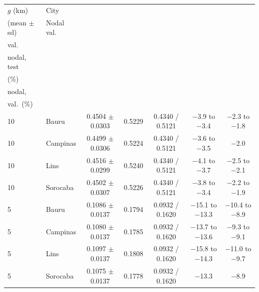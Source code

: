 \begin{tabular}{llccccc}
\toprule
$g$ (km) & City & \celula{Nodal test \\ \relax (mean $\pm$ sd)} & Nodal val. & \celula{Law test / \\ \relax val.} & \celula{Law vs.\ \\ \relax nodal, test \\ \relax (\%)} & \celula{Law vs.\ \\ \relax nodal, \\ \relax val.\ (\%)} \\
\midrule
10 & Bauru & 0.4504 $\pm$ 0.0303 & 0.5229 & 0.4340 / 0.5121 & $-$3.9 to $-$3.4 & $-$2.3 to $-$1.8 \\
10 & Campinas & 0.4499 $\pm$ 0.0306 & 0.5224 & 0.4340 / 0.5121 & $-$3.6 to $-$3.5 & $-$2.0 \\
10 & Lins & 0.4516 $\pm$ 0.0299 & 0.5240 & 0.4340 / 0.5121 & $-$4.1 to $-$3.7 & $-$2.5 to $-$2.1 \\
10 & Sorocaba & 0.4502 $\pm$ 0.0307 & 0.5226 & 0.4340 / 0.5121 & $-$3.8 to $-$3.4 & $-$2.2 to $-$1.9 \\
5 & Bauru & 0.1086 $\pm$ 0.0137 & 0.1794 & 0.0932 / 0.1620 & $-$15.1 to $-$13.3 & $-$10.4 to $-$8.9 \\
5 & Campinas & 0.1080 $\pm$ 0.0137 & 0.1785 & 0.0932 / 0.1620 & $-$13.7 to $-$13.6 & $-$9.3 to $-$9.1 \\
5 & Lins & 0.1097 $\pm$ 0.0137 & 0.1808 & 0.0932 / 0.1620 & $-$15.8 to $-$14.3 & $-$11.0 to $-$9.7 \\
5 & Sorocaba & 0.1075 $\pm$ 0.0137 & 0.1778 & 0.0932 / 0.1620 & $-$13.3 & $-$8.9 \\
\bottomrule
\end{tabular}
